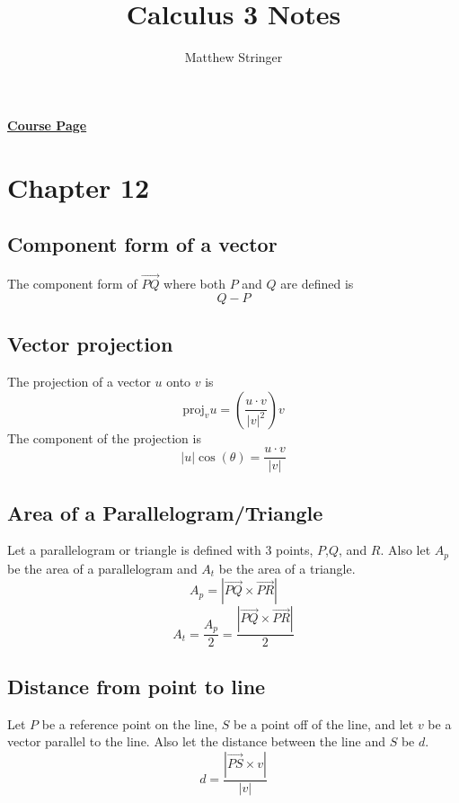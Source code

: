 \documentclass[12pt]{article}
\title{Calculus 3 Notes} %
\date{}
\author{Matthew Stringer} %
\theoremstyle{break}
\numberwithin{theorem}{subsection}
\numberwithin{lemma}{subsection}
\numberwithin{corollary}{subsection}
\numberwithin{equation}{subsection}
\begin{document}
\maketitle
\href{https://ocw.mit.edu/courses/mathematics/18-02sc-multivariable-calculus-fall-2010/index.htm}{\textbf{Course Page}}
\tableofcontents
\newpage

\section{Chapter 12}

\subsection{Component form of a vector}
The component form of $\vec{PQ}$ where both $P$ and $Q$ are defined is 
\begin{equation*}
	Q-P
\end{equation*}

\subsection{Vector projection}
The projection of a vector $u$ onto $v$ is 
\begin{equation*}
	\text{proj}_v u = \left( \frac{u \cdot v}{|v|^2} \right)v
\end{equation*}
The component of the projection is 
\begin{equation*}
	|u|\cos(\theta) = \frac{u \cdot v}{|v|}
\end{equation*}

\subsection{Area of a Parallelogram/Triangle}
Let a parallelogram or triangle is defined with 3 points, $P$,$Q$, and $R$.
Also let $A_p$ be the area of a parallelogram and $A_t$ be the area of a triangle.
\begin{equation*}
	A_p = | \vec{PQ} \times \vec{PR} |
\end{equation*}
\begin{equation*}
	A_t = \frac{A_p}{2} = \frac{|\vec{PQ} \times \vec{PR}|}{2}
\end{equation*}

\subsection{Distance from point to line}
Let $P$ be a reference point on the line, $S$ be a point off of the line, and let $v$ be a vector 
parallel to the line.
Also let the distance between the line and $S$ be $d$.
\begin{equation*}
	d = \frac{|\vec{PS} \times v|}{|v|}
\end{equation*}
\end{document}

